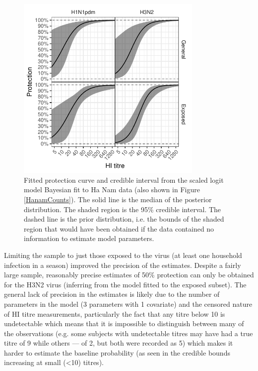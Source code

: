 \documentclass[12pt]{article}
\begin{document}
\pagebreak

\begin{figure}[htp]
	\centering
	\includegraphics[width=0.8\textwidth]{../fit-sclr-bayesian-plot/hanam-hi-prot.pdf}
	\caption{
	Fitted protection curve and credible interval from the scaled logit model Bayesian fit to Ha Nam data (also shown in Figure \ref{HanamCounts}). The solid line is the median of the posterior distribution. The shaded region is the 95\% credible interval. The dashed line is the prior distribution, i.e. the bounds of the shaded region that would have been obtained if the data contained no information to estimate model parameters.
	}
	\label{SclrBayesProt}
\end{figure}

Limiting the sample to just those exposed to the virus (at least one household infection in a season) improved the precision of the estimates. Despite a fairly large sample, reasonably precise estimates of 50\% protection can only be obtained for the H3N2 virus (inferring from the model fitted to the exposed subset). The general lack of precision in the estimates is likely due to the number of parameters in the model (3 parameters with 1 covariate) and the censored nature of HI titre measurements, particularly the fact that any titre below 10 is undetectable which means that it is impossible to distinguish between many of the observations (e.g. some subjects with undetectable titres may have had a true titre of 9 while others --- of 2, but both were recorded as 5) which makes it harder to estimate the baseline probability (as seen in the credible bounds increasing at small (<10) titres).
\end{document}
